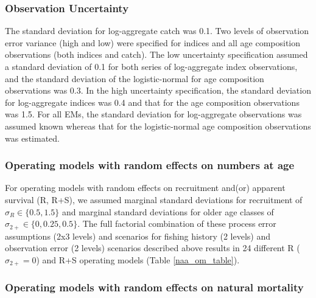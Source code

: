 \documentclass[
  12pt,
]{article}
\begin{document}
\hypertarget{observation-uncertainty}{%
\subsubsection*{Observation Uncertainty}\label{observation-uncertainty}}

The standard deviation for log-aggregate catch was 0.1. Two levels of
observation error variance (high and low) were specified for indices and
all age composition observations (both indices and catch). The low
uncertainty specification assumed a standard deviation of 0.1 for both
series of log-aggregate index observations, and the standard deviation
of the logistic-normal for age composition observations was 0.3. In the
high uncertainty specification, the standard deviation for log-aggregate
indices was 0.4 and that for the age composition observations was 1.5.
For all EMs, the standard deviation for log-aggregate observations was
assumed known whereas that for the logistic-normal age composition
observations was estimated.

\hypertarget{operating-models-with-random-effects-on-numbers-at-age}{%
\subsubsection*{Operating models with random effects on numbers at
age}\label{operating-models-with-random-effects-on-numbers-at-age}}

For operating models with random effects on recruitment and(or) apparent
survival (R, R+S), we assumed marginal standard deviations for
recruitment of \(\sigma_R \in \{0.5,1.5\}\) and marginal standard
deviations for older age classes of \(\sigma_{2+} \in \{0,0.25, 0.5\}\).
The full factorial combination of these process error assumptions (2x3
levels) and scenarios for fishing history (2 levels) and observation
error (2 levels) scenarios described above results in 24 different R
(\(\sigma_{2+} = 0\)) and R+S operating models (Table
\ref{naa_om_table}).

\hypertarget{operating-models-with-random-effects-on-natural-mortality}{%
\subsubsection*{Operating models with random effects on natural
mortality}\label{operating-models-with-random-effects-on-natural-mortality}}
\end{document}
